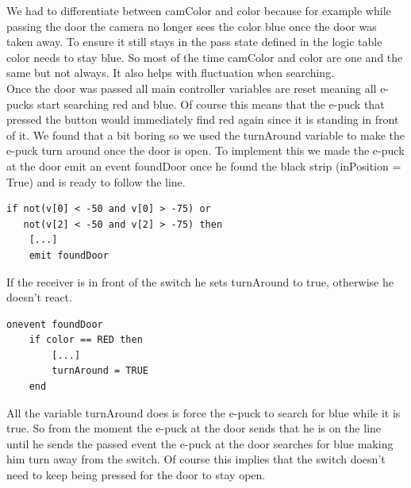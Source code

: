 \documentclass[12pt,a4paper]{article}
\begin{document}
\noindent We had to differentiate between camColor and color because for example while passing the door the camera no longer sees the color blue once the door was taken away. To ensure it still stays in the pass state defined in the logic table color needs to stay blue. So most of the time camColor and color are one and the same but not always. It also helps with fluctuation when searching. \\
Once the door was passed all main controller variables are reset meaning all e-pucks start searching red and blue. Of course this means that the e-puck that pressed the button would immediately find red again since it is standing in front of it. We found that a bit boring so we used the turnAround variable to make the e-puck turn around once the door is open. To implement this we made the e-puck at the door emit an event foundDoor once he found the black strip (inPosition = True) and is ready to follow the line.
\begin{lstlisting}
if not(v[0] < -50 and v[0] > -75) or 
   not(v[2] < -50 and v[2] > -75) then
	[...]
	emit foundDoor
\end{lstlisting}

\noindent If the receiver is in front of the switch he sets turnAround to true, otherwise he doesn't react.

\begin{lstlisting}
onevent foundDoor
	if color == RED then
		[...]
		turnAround = TRUE
	end
\end{lstlisting}
All the variable turnAround does is force the e-puck to search for blue while it is true. So from the moment the e-puck at the door sends that he is on the line until he sends the passed event the e-puck at the door searches for blue making him turn away from the switch. Of course this implies that the switch doesn't need to keep being pressed for the door to stay open.  
\end{document}
